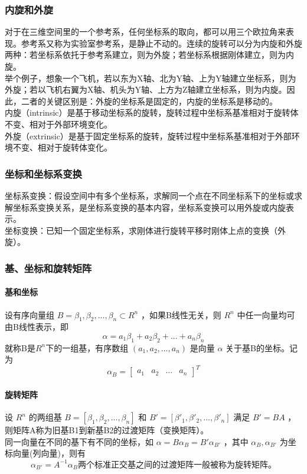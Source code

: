 \documentclass{ctexart}
\begin{document}
	\subsubsection{内旋和外旋}
	对于在三维空间里的一个参考系，任何坐标系的取向，都可以用三个欧拉角来表现。参考系又称为实验室参考系，是静止不动的。连续的旋转可以分为内旋和外旋两种：若坐标系依托于参考系建立，则为外旋；若坐标系根据刚体建立，则为内旋。
	\\\indent
	举个例子，想象一个飞机，若以东为X轴、北为Y轴、上为Y轴建立坐标系，则为外旋；若以飞机右翼为X轴、机头为Y轴、上方为Z轴建立坐标系，则为内旋。因此，二者的关键区别是：外旋的坐标系是固定的，内旋的坐标系是移动的。
	\\\indent
	内旋（intrinsic）是基于移动坐标系的旋转，旋转过程中坐标系基准相对于旋转体不变、相对于外部环境变化。
	\\\indent
	外旋（extrinsic）是基于固定坐标系的旋转，旋转过程中坐标系基准相对于外部环境不变、相对于旋转体变化。
	\subsubsection{坐标和坐标系变换}
	坐标系变换：假设空间中有多个坐标系，求解同一个点在不同坐标系下的坐标或求解坐标系变换关系，是坐标系变换的基本内容，坐标系变换可以用外旋或内旋表示。
	\\\indent
	坐标变换：已知一个固定坐标系，求刚体进行旋转平移时刚体上点的变换（外旋）。
	\subsubsection{基、坐标和旋转矩阵}
	\paragraph{基和坐标}
	设有序向量组 $B={\beta_1,\beta_2,...,\beta_n} \subset R^n$ ，如果B线性无关，则 $R^n$ 中任一向量均可由B线性表示，即
	\begin{equation}
	\alpha=a_1 \beta_1 + a_2 \beta_2 + ... + a_n \beta_n
	\end{equation}
	就称B是$R^n$下的一组基，有序数组 $(a_1,a_2,...,a_n)$ 是向量 $\alpha$ 关于基B的坐标。记为
	\begin{equation}
	\alpha_B =
	\begin{bmatrix}
	a_1 & a_2 & ... & a_n
	\end{bmatrix}^T
	\end{equation}
	\paragraph{旋转矩阵}
	设 $R^n$ 的两组基 $B=[\beta_1,\beta_2,...,\beta_n]$ 和 $B'=[\beta '_1,\beta '_2,...,\beta '_n]$ 满足 $B' = B A$ ，则矩阵A称为旧基B1到新基B2的过渡矩阵（变换矩阵）。
	\\
	同一向量在不同的基下有不同的坐标，如 $ \alpha = B \alpha_{B} = B' \alpha_{B'}$ ，其中 $\alpha_{B},\alpha_{B'}$ 为坐标向量(列向量)，则有
	\begin{equation}
	\alpha_{B'} = A^{-1} \alpha_{B}
	两个标准正交基之间的过渡矩阵一般被称为旋转矩阵。
	\end{equation}
\end{document}
